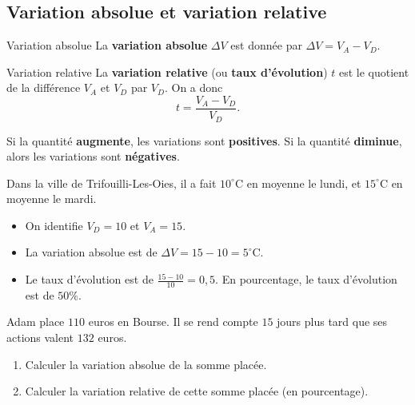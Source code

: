 \documentclass[11pt]{article}
\begin{document}
\subsection{Variation absolue et variation relative}
\begin{defi}{Variation absolue}
  La \textbf{variation absolue} $\Delta V$ est donnée par $\Delta V = V_A-V_D$.
\end{defi}
\begin{defi}{Variation relative}
  La \textbf{variation relative} (ou \textbf{taux d'évolution}) $t$ est le
  quotient de la différence $V_A$ et $V_D$ par $V_D$. On a donc
  \[
    t = \frac{V_A-V_D}{V_D}.
  \]
\end{defi}
\begin{rmq}
  Si la quantité \textbf{augmente}, les variations sont \textbf{positives}. Si
  la quantité \textbf{diminue}, alors les variations sont \textbf{négatives}.
\end{rmq}
\begin{exemple}
  Dans la ville de Trifouilli-Les-Oies, il a fait $10^\circ$C en moyenne le
  lundi, et $15^\circ$C en moyenne le mardi.
  \begin{itemize}
    \item On identifie $V_D=10$ et $V_A=15$.
    \item La variation absolue est de $\Delta V=15-10=5^\circ$C.
    \item Le taux d'évolution est de $\frac{15-10}{10}=0,5$. En pourcentage, le
      taux d'évolution est de $50\%$.
  \end{itemize}
\end{exemple}
\begin{app}
  Adam place $110$ euros en Bourse. Il se rend compte $15$ jours plus tard que
  ses actions valent $132$ euros.
  \begin{enumerate}
    \item Calculer la variation absolue de la somme placée.
    \item Calculer la variation relative de cette somme placée (en pourcentage).
  \end{enumerate}
\end{app}
\end{document}
